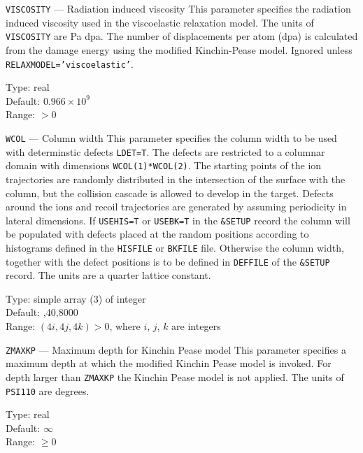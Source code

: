 \ifprivate
\begin{keydescription}{\texttt{VISCOSITY} --- Radiation induced viscosity}
%
  This parameter specifies the radiation induced viscosity used in the 
  viscoelastic relaxation model. The units of \texttt{VISCOSITY} are Pa dpa.
  The number of displacements per atom (dpa) is calculated from the damage 
  energy using the modified Kinchin-Pease model. Ignored unless 
  \texttt{RELAXMODEL='viscoelastic'}.
  \begin{keytab}
    Type:    \> real \\
    Default: \> $0.966 \times 10^9$ \\
    Range:   \> $>0$
  \end{keytab}
\end{keydescription}

\begin{keydescription}{\texttt{WCOL} --- Column width}
%
  This parameter specifies the column width to be used with
  determinstic defects \texttt{LDET=T}. The defects are restricted to a
  columnar domain with dimensions \texttt{WCOL(1)*WCOL(2)}. The starting
  points of the ion trajectories are randomly distributed in the intersection
  of the surface with the column, but the collision cascade is allowed to
  develop in the target. Defects around the ions and recoil trajectories are
  generated by assuming periodicity in lateral dimensions.  If
  \texttt{USEHIS=T} or \texttt{USEBK=T} in the \texttt{\&SETUP} record the
  column will be populated with defects placed at the random positions
  according to histograms defined in the \texttt{HISFILE} or \texttt{BKFILE} file.
  Otherwise the column width, together with the defect positions is to be defined
  in \texttt{DEFFILE} of the \texttt{\&SETUP} record. The units are a quarter
  lattice constant.
  \begin{keytab} 
    Type: \> simple array (3) of integer \\ 
    Default: ,40,8000 \\
    Range: \> $(4i,4j,4k)>0$, where $i$, $j$, $k$ are integers \\ 
  \end{keytab}
\end{keydescription}
\fi

\begin{keydescription}{\texttt{ZMAXKP} --- Maximum depth for Kinchin
    Pease model}
%
  This parameter specifies a maximum depth at which the modified
  Kinchin Pease model is invoked. For depth larger than
  \texttt{ZMAXKP} the Kinchin Pease model is not applied.  The units
  of \texttt{PSI110} are degrees.
  \begin{keytab}
    Type:    \> real \\
    Default: \> $\infty$ \\
    Range:   \> $\ge 0$
  \end{keytab}
\end{keydescription}

